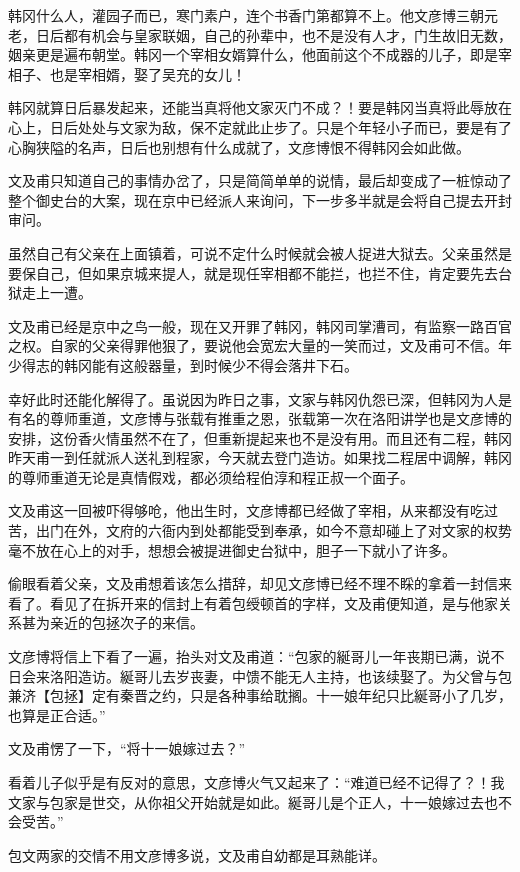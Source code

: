 韩冈什么人，灌园子而已，寒门素户，连个书香门第都算不上。他文彦博三朝元老，日后都有机会与皇家联姻，自己的孙辈中，也不是没有人才，门生故旧无数，姻亲更是遍布朝堂。韩冈一个宰相女婿算什么，他面前这个不成器的儿子，即是宰相子、也是宰相婿，娶了吴充的女儿！

韩冈就算日后暴发起来，还能当真将他文家灭门不成？！要是韩冈当真将此辱放在心上，日后处处与文家为敌，保不定就此止步了。只是个年轻小子而已，要是有了心胸狭隘的名声，日后也别想有什么成就了，文彦博恨不得韩冈会如此做。

文及甫只知道自己的事情办岔了，只是简简单单的说情，最后却变成了一桩惊动了整个御史台的大案，现在京中已经派人来询问，下一步多半就是会将自己提去开封审问。

虽然自己有父亲在上面镇着，可说不定什么时候就会被人捉进大狱去。父亲虽然是要保自己，但如果京城来提人，就是现任宰相都不能拦，也拦不住，肯定要先去台狱走上一遭。

文及甫已经是京中之鸟一般，现在又开罪了韩冈，韩冈司掌漕司，有监察一路百官之权。自家的父亲得罪他狠了，要说他会宽宏大量的一笑而过，文及甫可不信。年少得志的韩冈能有这般器量，到时候少不得会落井下石。

幸好此时还能化解得了。虽说因为昨日之事，文家与韩冈仇怨已深，但韩冈为人是有名的尊师重道，文彦博与张载有推重之恩，张载第一次在洛阳讲学也是文彦博的安排，这份香火情虽然不在了，但重新提起来也不是没有用。而且还有二程，韩冈昨天甫一到任就派人送礼到程家，今天就去登门造访。如果找二程居中调解，韩冈的尊师重道无论是真情假戏，都必须给程伯淳和程正叔一个面子。

文及甫这一回被吓得够呛，他出生时，文彦博都已经做了宰相，从来都没有吃过苦，出门在外，文府的六衙内到处都能受到奉承，如今不意却碰上了对文家的权势毫不放在心上的对手，想想会被提进御史台狱中，胆子一下就小了许多。

偷眼看着父亲，文及甫想着该怎么措辞，却见文彦博已经不理不睬的拿着一封信来看了。看见了在拆开来的信封上有着包绶顿首的字样，文及甫便知道，是与他家关系甚为亲近的包拯次子的来信。

文彦博将信上下看了一遍，抬头对文及甫道：“包家的綖哥儿一年丧期已满，说不日会来洛阳造访。綖哥儿去岁丧妻，中馈不能无人主持，也该续娶了。为父曾与包兼济【包拯】定有秦晋之约，只是各种事给耽搁。十一娘年纪只比綖哥小了几岁，也算是正合适。”

文及甫愣了一下，“将十一娘嫁过去？”

看着儿子似乎是有反对的意思，文彦博火气又起来了：“难道已经不记得了？！我文家与包家是世交，从你祖父开始就是如此。綖哥儿是个正人，十一娘嫁过去也不会受苦。”

包文两家的交情不用文彦博多说，文及甫自幼都是耳熟能详。

